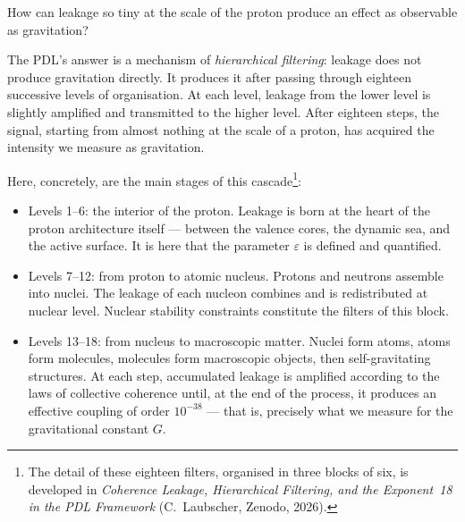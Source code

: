 \documentclass[11pt, a4paper, openright]{book}
\begin{document}
How can leakage so tiny at the scale of the proton produce an effect as observable as gravitation?

The PDL’s answer is a mechanism of \emph{hierarchical filtering}: leakage does not produce gravitation directly. It produces it after passing through eighteen successive levels of organisation. At each level, leakage from the lower level is slightly amplified and transmitted to the higher level. After eighteen steps, the signal, starting from almost nothing at the scale of a proton, has acquired the intensity we measure as gravitation.

Here, concretely, are the main stages of this cascade\footnote{%
  The detail of these eighteen filters, organised in three blocks of six, is developed in \emph{Coherence Leakage, Hierarchical Filtering, and the Exponent~18 in the PDL Framework} (C.~Laubscher, Zenodo, 2026).}:

\begin{itemize}
  \item Levels 1–6: the interior of the proton. Leakage is born at the heart of the proton architecture itself — between the valence cores, the dynamic sea, and the active surface. It is here that the parameter $\varepsilon$ is defined and quantified.
  \item Levels 7–12: from proton to atomic nucleus. Protons and neutrons assemble into nuclei. The leakage of each nucleon combines and is redistributed at nuclear level. Nuclear stability constraints constitute the filters of this block.
  \item Levels 13–18: from nucleus to macroscopic matter. Nuclei form atoms, atoms form molecules, molecules form macroscopic objects, then self-gravitating structures. At each step, accumulated leakage is amplified according to the laws of collective coherence until, at the end of the process, it produces an effective coupling of order $10^{-38}$ — that is, precisely what we measure for the gravitational constant $G$.
\end{itemize}

\medskip
\end{document}
